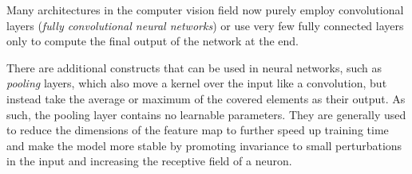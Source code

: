 Many architectures in the computer vision field now purely employ convolutional layers (\emph{fully convolutional neural networks}) or use very few fully connected layers only to compute the final output of the network at the end. 

There are additional constructs that can be used in neural networks, such as \emph{pooling} layers, which also move a kernel over the input like a convolution, but instead take the average or maximum of the covered elements as their output. As such, the pooling layer contains no learnable parameters. They are generally used to reduce the dimensions of the feature map to further speed up training time and make the model more stable by promoting invariance to small perturbations in the input and increasing the receptive field of a neuron.
